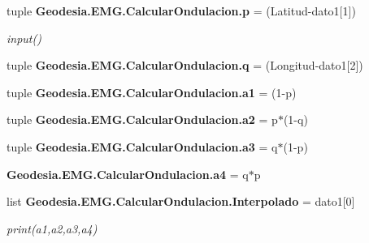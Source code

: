 \begin{DoxyCompactItemize}
tuple {\bf Geodesia.\-E\-M\-G.\-Calcular\-Ondulacion.\-p} = (Latitud-\/dato1[1])
\begin{DoxyCompactList}\small\item\em input() \end{DoxyCompactList}\item 
tuple {\bf Geodesia.\-E\-M\-G.\-Calcular\-Ondulacion.\-q} = (Longitud-\/dato1[2])
\item 
tuple {\bf Geodesia.\-E\-M\-G.\-Calcular\-Ondulacion.\-a1} = (1-\/p)
\item 
tuple {\bf Geodesia.\-E\-M\-G.\-Calcular\-Ondulacion.\-a2} = p$\ast$(1-\/q)
\item 
tuple {\bf Geodesia.\-E\-M\-G.\-Calcular\-Ondulacion.\-a3} = q$\ast$(1-\/p)
\item 
{\bf Geodesia.\-E\-M\-G.\-Calcular\-Ondulacion.\-a4} = q$\ast$p
\item 
list {\bf Geodesia.\-E\-M\-G.\-Calcular\-Ondulacion.\-Interpolado} = dato1[0]
\begin{DoxyCompactList}\small\item\em print(a1,a2,a3,a4) \end{DoxyCompactList}\end{DoxyCompactItemize}
